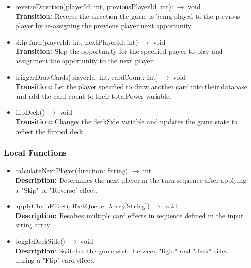 \documentclass[12pt, titlepage]{article}
\begin{document}
\begin{itemize}
\item reverseDirection(playerId: int, previousPlayerId: int): $\rightarrow$ void\\
\textbf{Transition:} Reverse the direction the game is being played to the previous player by re-assigning the previous player next opportunity

\item skipTurn(playerId: int, nextPlayerId: int) $\rightarrow$ void\\
\textbf{Transition:} Skip the opportunity for the specified player to play and assignment the opportunity to the next player

\item triggerDrawCards(playerId: int, cardCount: Int) $\rightarrow$ void\\
\textbf{Transition:} Let the player specified to draw another card into their database and add the card count to their totalPower variable.

\item flipDeck() $\rightarrow$ void\\
\textbf{Transition:} Changes the deckSide variable and updates the game state to reflect the flipped deck.

\end{itemize}


\subsubsection{Local Functions}
\begin{itemize}
\item calculateNextPlayer(direction: String) $\rightarrow$ int\\
\textbf{Description:} Determines the next player in the turn sequence after applying a "Skip" or "Reverse" effect.

\item applyChainEffect(effectQueue: Array[String]) $\rightarrow$ void\\
\textbf{Description:} Resolves multiple card effects in sequence defined in the input string array

\item toggleDeckSide() $\rightarrow$ void\\
\textbf{Description:} Switches the game state between "light" and "dark" sides during a "Flip" card effect.
\end{itemize}
\end{document}
